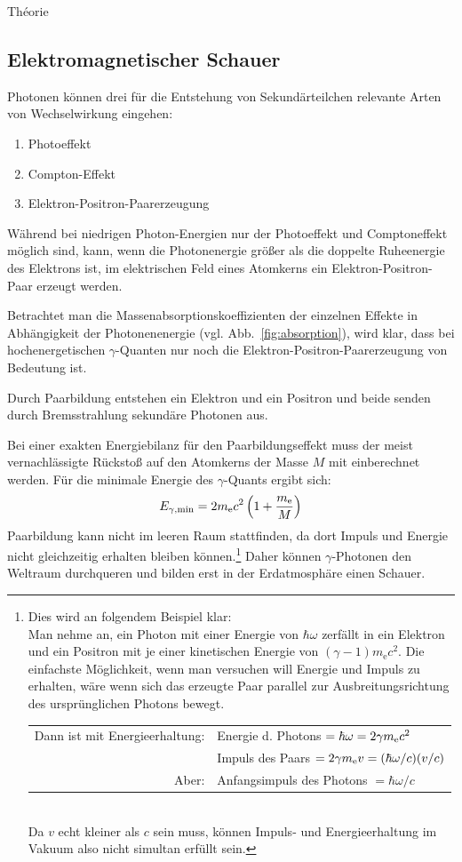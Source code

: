\documentclass[a4paper,11pt,liststotocnumbered,bibtotocnumbered]{scrartcl}
\begin{document}
\begin{section}{Théorie}
   \subsection{Elektromagnetischer Schauer}
    Photonen können drei für die Entstehung von Sekundärteilchen relevante Arten von Wechselwirkung eingehen:
    \begin{enumerate}
     \item{Photoeffekt}
     \item{Compton-Effekt}
     \item{Elektron-Positron-Paarerzeugung}
    \end{enumerate}
    Während bei niedrigen Photon-Energien nur der Photoeffekt und Comptoneffekt möglich sind, kann, wenn die Photonenergie größer als die doppelte Ruheenergie des Elektrons ist, im elektrischen Feld eines Atomkerns ein Elektron-Positron-Paar erzeugt werden.

    Betrachtet man die Massenabsorptionskoeffizienten der einzelnen Effekte in Abhängigkeit der Photonenenergie (vgl. Abb.~\ref{fig:absorption}), wird klar, dass bei hochenergetischen $\gamma$-Quanten nur noch die Elektron-Positron-Paarerzeugung von Bedeutung ist.

    Durch Paarbildung entstehen ein Elektron und ein Positron und beide senden durch Bremsstrahlung sekundäre Photonen aus.

    Bei einer exakten Energiebilanz für den Paarbildungseffekt muss der meist vernachlässigte Rückstoß auf den Atomkerns der Masse $M$ mit einberechnet werden. Für die minimale Energie des $\gamma$-Quants ergibt sich:
    \begin{equation*}
     E_{\gamma, \textnormal{min}} = 2 m_{\textnormal{e}} c^2 \left( 1 + \frac{m_{\textnormal{e}}}{M} \right)
    \end{equation*}
    Paarbildung kann nicht im leeren Raum stattfinden, da dort Impuls und Energie nicht gleichzeitig erhalten bleiben können.\footnote{
    Dies wird an folgendem Beispiel klar:\\
    Man nehme an, ein Photon mit einer Energie von $ \hbar \omega $ zerfällt in ein Elektron und ein Positron mit je 	einer kinetischen Energie von $ (\gamma - 1)m_{\text{e}}c^2 $. Die einfachste Möglichkeit, wenn man versuchen will Energie und Impuls zu erhalten, wäre wenn sich das erzeugte Paar parallel zur Ausbreitungsrichtung des ursprünglichen Photons bewegt.\\
    \begin{tabular}{rl}
     Dann ist mit Energieerhaltung: & Energie d. Photons $= \hbar \omega = 2\gamma m_{\textnormal{e}}c^2$\\
     & Impuls des Paars $ = 2 \gamma m_{\textnormal{e}} v = (\hbar \omega / c)(v/c)$\\
     Aber: & Anfangsimpuls des Photons $ = \hbar \omega / c $
    \end{tabular}\\
    Da $v$ echt kleiner als $c$ sein muss, können Impuls- und Energieerhaltung im Vakuum also nicht simultan erfüllt sein.}
    Daher können $\gamma$-Photonen den Weltraum durchqueren und bilden erst in der Erdatmosphäre einen Schauer.


\end{section}
\end{document}
